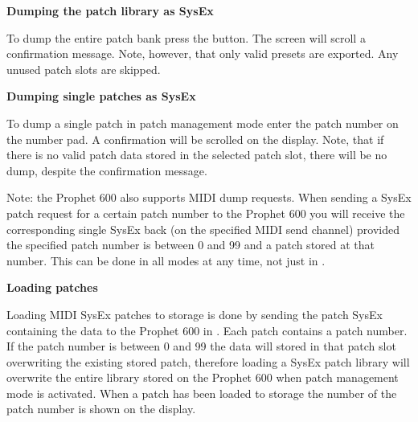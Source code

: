 {
}


\textbf{Dumping the patch library as SysEx} 

To dump the entire patch bank press the \preset button. The screen will scroll a confirmation message. Note, however, that only valid presets are exported. Any unused patch slots are skipped.

\textbf{Dumping single patches as SysEx} 

To dump a single patch in patch management mode enter the patch number on the number pad. A confirmation will be scrolled on the display. Note, that if there is no valid patch data stored in the selected patch slot, there will be no dump, despite the confirmation message.

Note: the Prophet 600 also supports MIDI dump requests. When sending a SysEx patch request for a certain patch number to the Prophet 600 you will receive the corresponding single SysEx back (on the specified MIDI send channel) provided the specified patch number is between 0 and 99 and a patch stored at that number. This can be done in all modes at any time, not just in \patchmgmt.

\textbf{Loading patches} 

Loading MIDI SysEx patches to storage is done by sending the patch SysEx containing the data to the Prophet 600 in \patchmgmt. Each patch contains a patch number. If the patch number is  between 0 and 99 the data will stored in that patch slot overwriting the existing stored patch, therefore loading a SysEx patch library will overwrite the entire library stored on the Prophet 600 when patch management mode is activated. When a patch has been loaded to storage the number of the patch number is shown on the display.

